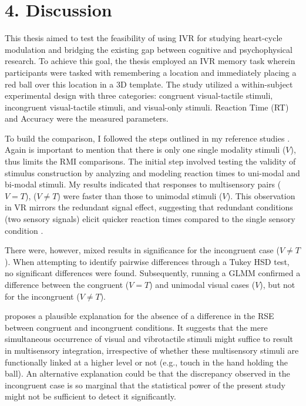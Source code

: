 \documentclass[12pt,oneside,openright]{report}
\begin{document}
\pagebreak
\section*{4. Discussion}

This thesis aimed to test the feasibility of using IVR for studying heart-cycle modulation and bridging the existing gap between cognitive and psychophysical research. To achieve this goal, the thesis employed an IVR memory task wherein participants were tasked with remembering a location and immediately placing a red ball over this location in a 3D template. The study utilized a within-subject experimental design with three categories: congruent visual-tactile stimuli, incongruent visual-tactile stimuli, and visual-only stimuli. Reaction Time (RT) and Accuracy were the measured parameters.

To build the comparison, I followed the steps outlined in my reference studies \parencite{Innes2019ACA, SALTAFOSSI2023108642, Ulrich2007}. Again is important to mention that there is only one single modality stimuli ($V$), thus limits the RMI comparisons. The initial step involved testing the validity of stimulus construction by analyzing and modeling reaction times to uni-modal and bi-modal stimuli. My results indicated that responses to multisensory pairs ($V=T$), ($V \neq T$) were faster than those to unimodal stimuli ($V$). This observation in VR mirrors the redundant signal effect, suggesting that redundant conditions (two sensory signals) elicit quicker reaction times compared to the single sensory condition \parencite*{SALTAFOSSI2023108642}.

There were, however, mixed results in significance for the incongruent case ($V \neq T$). When attempting to identify pairwise differences through a Tukey HSD test, no significant differences were found. Subsequently, running a GLMM confirmed a difference between the congruent ($V=T$) and unimodal visual cases ($V$), but not for the incongruent ($V \neq T$).

\Cite{RSE_FBI} proposes a plausible explanation for the absence of a difference in the RSE between congruent and incongruent conditions. It suggests that the mere simultaneous occurrence of visual and vibrotactile stimuli might suffice to result in multisensory integration, irrespective of whether these multisensory stimuli are functionally linked at a higher level or not (e.g., touch in the hand holding the ball). An alternative explanation could be that the discrepancy observed in the incongruent case is so marginal that the statistical power of the present study might not be sufficient to detect it significantly.
\end{document}
